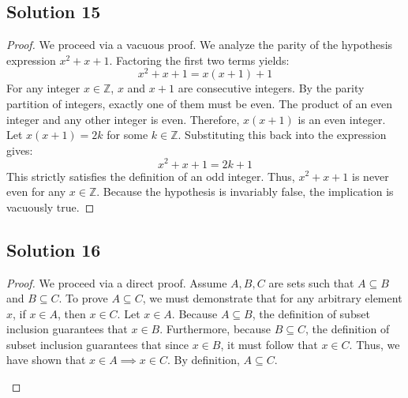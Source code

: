 \documentclass[12pt]{article}
\begin{document}
\subsection*{Solution 15}
\begin{proof}
We proceed via a vacuous proof. We analyze the parity of the hypothesis expression $x^2 + x + 1$. Factoring the first two terms yields:
\[ x^2 + x + 1 = x(x + 1) + 1 \]
For any integer $x \in \mathbb{Z}$, $x$ and $x+1$ are consecutive integers. By the parity partition of integers, exactly one of them must be even. The product of an even integer and any other integer is even. Therefore, $x(x+1)$ is an even integer. Let $x(x+1) = 2k$ for some $k \in \mathbb{Z}$. Substituting this back into the expression gives:
\[ x^2 + x + 1 = 2k + 1 \]
This strictly satisfies the definition of an odd integer. Thus, $x^2 + x + 1$ is never even for any $x \in \mathbb{Z}$. Because the hypothesis is invariably false, the implication is vacuously true.
\end{proof}

\subsection*{Solution 16}
\begin{proof}
We proceed via a direct proof. Assume $A, B, C$ are sets such that $A \subseteq B$ and $B \subseteq C$. To prove $A \subseteq C$, we must demonstrate that for any arbitrary element $x$, if $x \in A$, then $x \in C$. 
Let $x \in A$. Because $A \subseteq B$, the definition of subset inclusion guarantees that $x \in B$. Furthermore, because $B \subseteq C$, the definition of subset inclusion guarantees that since $x \in B$, it must follow that $x \in C$. 
Thus, we have shown that $x \in A \implies x \in C$. By definition, $A \subseteq C$.

\begin{center}
\end{center}
\end{proof}
\end{document}
